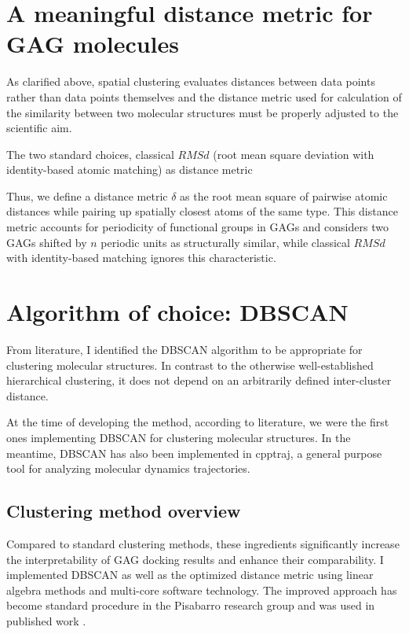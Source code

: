 \section{A meaningful distance metric for GAG molecules}

As clarified above, spatial clustering evaluates distances between data points
rather than data points themselves and the distance metric used for calculation
of the similarity between two molecular structures must be properly adjusted to
the scientific aim.

The two standard choices, classical $RMSd$ (root mean square deviation with identity-based atomic matching) as distance metric


Thus, we define a distance metric $\delta$ as the root mean
square of pairwise atomic distances while pairing up spatially closest atoms of
the same type. This distance metric accounts for periodicity of functional
groups in GAGs and considers two GAGs shifted by $n$ periodic units as
structurally similar, while classical $RMSd$ with identity-based matching
ignores this characteristic.

\lipsum[1-2]


\section{Algorithm of choice: DBSCAN}

\lipsum[1-2]

From literature, I identified the DBSCAN algorithm \cite{dbscanref} to be
appropriate for clustering molecular structures. In contrast to the otherwise
well-established hierarchical clustering, it does not depend on an arbitrarily
defined inter-cluster distance.

At the time of developing the method, according to literature, we were the first
ones implementing DBSCAN for clustering molecular structures. In the meantime,
DBSCAN has also been implemented in cpptraj, a general purpose tool for
analyzing molecular dynamics trajectories.

\subsection{Clustering method overview}

Compared to standard clustering methods, these ingredients significantly
increase the interpretability of GAG docking results and enhance their
comparability. I implemented DBSCAN as well as the optimized distance metric
using linear algebra methods and multi-core software technology. The improved
approach has become standard procedure in the Pisabarro research group and was
used in published work \cite{franz_cathepsin_2013}.


